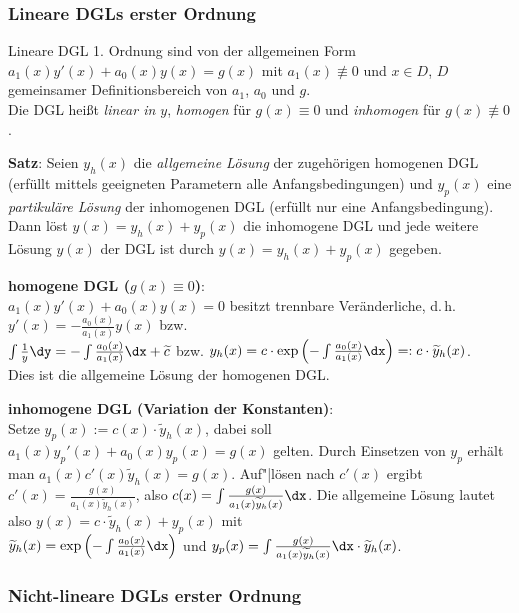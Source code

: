 \subsubsection{%
    Lineare DGLs erster Ordnung%
}

Lineare DGL 1. Ordnung sind von der allgemeinen Form
$a_1(x) y'(x) + a_0(x) y(x) = g(x)$
mit $a_1(x) \not\equiv 0$ und $x \in D$, $D$ gemeinsamer Definitionsbereich
von $a_1$, $a_0$ und $g$. \\
Die DGL heißt \emph{linear in $y$},
\emph{homogen} für $g(x) \equiv 0$ und \emph{inhomogen}
für $g(x) \not\equiv 0$.

\textbf{Satz}:
Seien $y_h(x)$ die \emph{allgemeine Lösung} der zugehörigen homogenen DGL
(erfüllt mittels geeigneten Parametern alle Anfangsbedingungen)
und $y_p(x)$ eine \emph{partikuläre Lösung} der inhomogenen DGL
(erfüllt nur eine Anfangsbedingung).
Dann löst $y(x) = y_h(x) + y_p(x)$ die inhomogene DGL und
jede weitere Lösung $y(x)$ der DGL ist durch $y(x) = y_h(x) + y_p(x)$
gegeben.

\textbf{homogene DGL ($g(x) \equiv 0$)}: \\
$a_1(x) y'(x) + a_0(x) y(x) = 0$ besitzt trennbare Veränderliche, d.\,h.
$y'(x) = -\frac{a_0(x)}{a_1(x)} y(x)$ bzw. \\
$\int \frac{1}{y} \dy = -\int \frac{a_0(x)}{a_1(x)}\dx + \widetilde{c}$ bzw.
$y_h(x) = c \cdot \exp\left(-\int \frac{a_0(x)}{a_1(x)}\dx\right) =:
c \cdot \widetilde{y}_h(x)$. \\
Dies ist die allgemeine Lösung der homogenen DGL.

\textbf{inhomogene DGL (Variation der Konstanten)}: \\
Setze $y_p(x) := c(x) \cdot \widetilde{y}_h(x)$, dabei soll
$a_1(x) y_p'(x) + a_0(x) y_p(x) = g(x)$ gelten.
Durch Einsetzen von $y_p$ erhält man $a_1(x) c'(x) \widetilde{y}_h(x) = g(x)$.
Auf"|lösen nach $c'(x)$ ergibt
$c'(x) = \frac{g(x)}{a_1(x) \widetilde{y}_h(x)}$,
also $c(x) = \int \frac{g(x)}{a_1(x) \widetilde{y}_h(x)}\dx$.
Die allgemeine Lösung lautet also $y(x) = c \cdot \widetilde{y}_h(x) + y_p(x)$
mit \\
$\widetilde{y}_h(x) = \exp\left(-\int \frac{a_0(x)}{a_1(x)}\dx\right)$ und
$y_p(x) = \int \frac{g(x)}{a_1(x) \widetilde{y}_h(x)}\dx
\cdot \widetilde{y}_h(x)$.

\subsubsection{%
    Nicht-lineare DGLs erster Ordnung%
}

